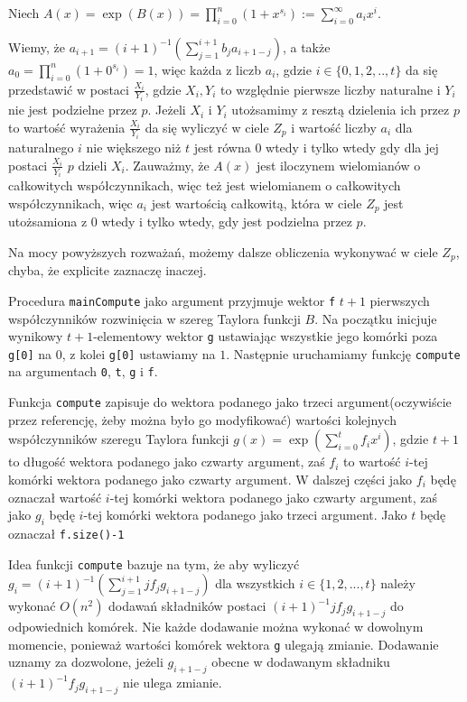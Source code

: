 \documentclass{article}
\begin{document}
Niech $A(x)=\exp(B(x))=\prod_{i=0}^n(1+x^{s_i}):=\sum_{i=0}^{\infty}a_ix^i$.

Wiemy, że $a_{i+1}=(i+1)^{-1}(\sum_{j=1}^{i+1}b_ja_{i+1-j})$, a także $a_0=\prod_{i=0}^n(1+0^{s_i})=1$, więc każda
z liczb $a_i$, gdzie $i \in \{0,1,2,..,t \}$ da się przedstawić w postaci $\frac{X_i}{Y_i}$, gdzie $X_i,Y_i$ to
względnie pierwsze liczby naturalne i $Y_i$ nie jest podzielne przez $p$. Jeżeli $X_i$ i $Y_i$ utożsamimy z resztą dzielenia ich 
przez $p$ to wartość wyrażenia $\frac{X_i}{Y_i}$ da się wyliczyć w ciele $Z_p$ i wartość liczby $a_i$ dla naturalnego $i$
nie większego niż $t$ jest równa $0$ wtedy i tylko wtedy gdy dla jej postaci $\frac{X_i}{Y_i}$ $p$ dzieli $X_i$. Zauważmy,
że $A(x)$ jest iloczynem wielomianów o całkowitych współczynnikach, więc też jest wielomianem o całkowitych współczynnikach,
więc $a_i$ jest wartością całkowitą, która w ciele $Z_p$ jest utożsamiona z $0$ wtedy i tylko wtedy, gdy jest podzielna przez $p$.

Na mocy powyższych rozważań, możemy dalsze obliczenia wykonywać w ciele $Z_p$, chyba, że explicite zaznaczę inaczej.


Procedura \texttt{mainCompute} jako argument przyjmuje wektor \texttt{f} $t+1$ pierwszych współczynników rozwinięcia w 
szereg Taylora funkcji $B$. Na początku inicjuje wynikowy $t+1$-elementowy wektor \texttt{g} ustawiając wszystkie
jego komórki poza \texttt{g[0]} na $0$, z kolei \texttt{g[0]} ustawiamy na $1$. Następnie uruchamiamy funkcję 
\texttt{compute} na argumentach \texttt{0}, \texttt{t}, \texttt{g} i \texttt{f}.

Funkcja \texttt{compute} zapisuje do wektora podanego jako trzeci argument(oczywiście przez referencję, żeby 
można było go modyfikować) wartości kolejnych współczynników szeregu Taylora funkcji 
$g(x)=\exp(\sum_{i=0}^tf_ix^i)$, gdzie $t+1$ to długość wektora podanego jako czwarty argument, zaś
$f_i$ to wartość $i$-tej komórki wektora podanego jako czwarty argument. W dalszej części jako $f_i$ będę 
oznaczał wartość $i$-tej komórki wektora podanego jako czwarty argument, zaś jako $g_i$ będę 
$i$-tej komórki wektora podanego jako trzeci argument. Jako $t$ będę oznaczał \texttt{f.size()-1}

Idea funkcji \texttt{compute} bazuje na tym, że aby wyliczyć $g_i=(i+1)^{-1}(\sum_{j=1}^{i+1}jf_jg_{i+1-j})$ dla wszystkich $i \in \{1,2,...,t\}$ należy
wykonać $O(n^2)$ dodawań składników postaci $(i+1)^{-1}jf_jg_{i+1-j}$ do odpowiednich komórek. Nie każde dodawanie można wykonać w dowolnym
momencie, ponieważ wartości komórek wektora \texttt{g} ulegają zmianie. Dodawanie uznamy za dozwolone, jeżeli $g_{i+1-j}$ obecne w 
dodawanym składniku $(i+1)^{-1}f_jg_{i+1-j}$ nie ulega zmianie. 
\end{document}
